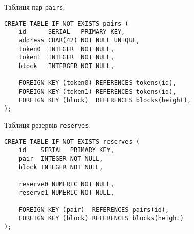 \documentclass[14pt]{extarticle}
\begin{document}
Таблиця пар \texttt{pairs}:

\begin{verbatim}
CREATE TABLE IF NOT EXISTS pairs (
    id      SERIAL   PRIMARY KEY,
    address CHAR(42) NOT NULL UNIQUE,
    token0  INTEGER  NOT NULL,
    token1  INTEGER  NOT NULL,
    block   INTERGER NOT NULL,

    FOREIGN KEY (token0) REFERENCES tokens(id),
    FOREIGN KEY (token1) REFERENCES tokens(id),
    FOREIGN KEY (block)  REFERENCES blocks(height),
);
\end{verbatim}

Таблиця резервів \texttt{reserves}:

\begin{verbatim}
CREATE TABLE IF NOT EXISTS reserves (
    id    SERIAL  PRIMARY KEY,
    pair  INTEGER NOT NULL,
    block INTEGER NOT NULL,

    reserve0 NUMERIC NOT NULL,
    reserve1 NUMERIC NOT NULL,

    FOREIGN KEY (pair)  REFERENCES pairs(id),
    FOREIGN KEY (block) REFERENCES blocks(height)
);
\end{verbatim}
\end{document}

